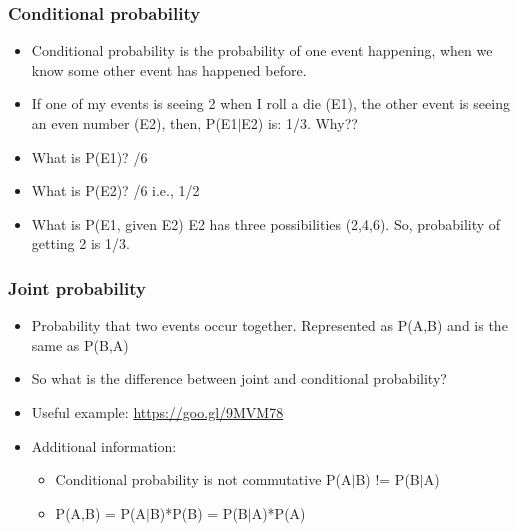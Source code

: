 \documentclass{beamer}
\begin{document}
\begin{frame}
\frametitle{Conditional probability}
\begin{itemize}
\item Conditional probability is the probability of one event happening, when we know some other event has happened before.
\item If one of my events is seeing 2 when I roll a die (E1), the other event is seeing an even number (E2), then, P(E1$|$E2) is: 1/3. Why?? \pause
\item What is P(E1)? /6
\item What is P(E2)? /6 i.e., 1/2
\item What is P(E1, given E2) \pause E2 has three possibilities (2,4,6). So, probability of getting 2 is 1/3.
\end{itemize}
\end{frame}

\begin{frame}
\frametitle{Joint probability}
\begin{itemize}
\item Probability that two events occur together. Represented as P(A,B) and is the same as P(B,A)
\item So what is the difference between joint and conditional probability? \pause
\item Useful example: \url{https://goo.gl/9MVM78} \pause
\item Additional information: 
\begin{itemize}
\item Conditional probability is not commutative P(A$|$B) != P(B$|$A)
\item P(A,B) = P(A$|$B)*P(B) =  P(B$|$A)*P(A)
\end{itemize}
\end{itemize}
\end{frame}
\end{document}

